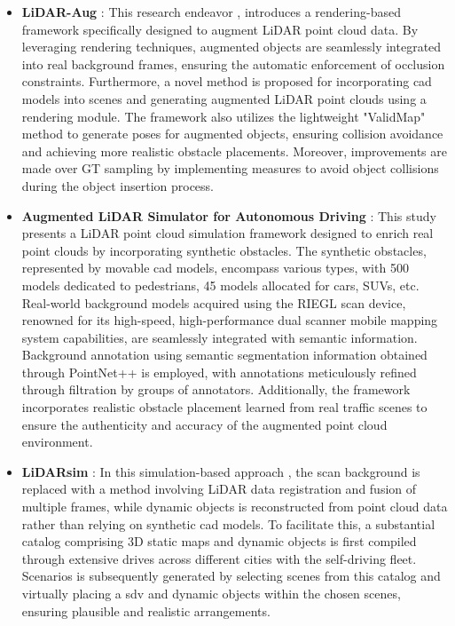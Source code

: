 \begin{itemize}
    \item \textbf{LiDAR-Aug} : This research endeavor \parencite{lidar_aug}, introduces a rendering-based framework specifically designed to augment LiDAR point cloud data. By leveraging rendering techniques, augmented objects are seamlessly integrated into real background frames, ensuring the automatic enforcement of occlusion constraints. Furthermore, a novel method is proposed for incorporating \acrfull{cad} models into scenes and generating augmented LiDAR point clouds using a rendering module. The framework also utilizes the lightweight "ValidMap" method to generate poses for augmented objects, ensuring collision avoidance and achieving more realistic obstacle placements. Moreover, improvements are made over GT sampling by implementing measures to avoid object collisions during the object insertion process.
    \item \textbf{Augmented LiDAR Simulator for Autonomous Driving} : This study \parencite{aug_lidar_sim_2020} presents a LiDAR point cloud simulation framework  designed to enrich real point clouds by incorporating synthetic obstacles. The synthetic obstacles, represented by movable \acrshort{cad} models, encompass various types, with 500 models dedicated to pedestrians, 45 models allocated for cars, SUVs, etc. Real-world background models acquired using the RIEGL scan device, renowned for its high-speed, high-performance dual scanner mobile mapping system capabilities, are seamlessly integrated with semantic information. Background annotation using semantic segmentation information obtained through PointNet++ \parencite{pointnetplus2017} is employed, with annotations meticulously refined through filtration by groups of annotators. Additionally, the framework incorporates realistic obstacle placement learned from real traffic scenes to ensure the authenticity and accuracy of the augmented point cloud environment.
    \item \textbf{LiDARsim} : In this simulation-based approach \parencite{lidarsim2020}, the scan background is replaced with a method involving LiDAR data registration and fusion of multiple frames, while dynamic objects is reconstructed from point cloud data rather than relying on synthetic \acrshort{cad} models. To facilitate this, a substantial catalog comprising 3D static maps and dynamic objects is first compiled through extensive drives across different cities with the self-driving fleet. Scenarios is subsequently generated by selecting scenes from this catalog and virtually placing a \acrfull{sdv} and dynamic objects within the chosen scenes, ensuring plausible and realistic arrangements.

\end{itemize}
